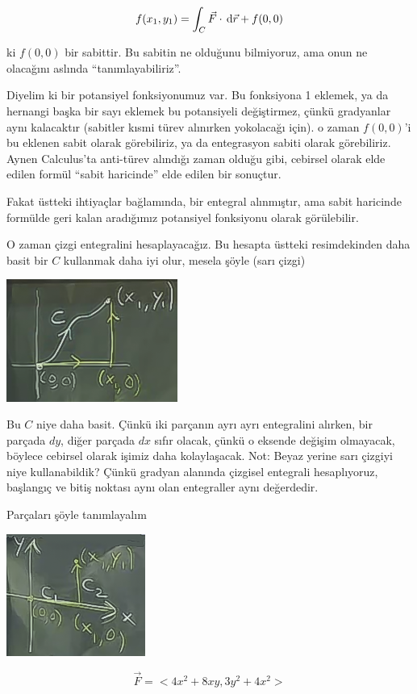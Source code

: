 \documentclass[12pt,fleqn]{article}\usepackage{../../common}
\begin{document}
$$ f(x_1,y_1) = \int_C \vec{F} \cdot \,\mathrm{d}\vec{r} + f(0,0) $$

ki $f(0,0)$ bir sabittir. Bu sabitin ne olduğunu bilmiyoruz, ama onun ne
olacağını aslında ``tanımlayabiliriz''. 

Diyelim ki bir potansiyel fonksiyonumuz var. Bu fonksiyona 1 eklemek, ya da
hernangi başka bir sayı eklemek bu potansiyeli değiştirmez, çünkü gradyanlar
aynı kalacaktır (sabitler kısmi türev alınırken yokolacağı için). o zaman
$f(0,0)$'i bu eklenen sabit olarak görebiliriz, ya da entegrasyon sabiti olarak
görebiliriz. Aynen Calculus'ta anti-türev alındığı zaman olduğu gibi, cebirsel
olarak elde edilen formül ``sabit haricinde'' elde edilen bir sonuçtur.

Fakat üstteki ihtiyaçlar bağlamında, bir entegral alınmıştır, ama sabit
haricinde formülde geri kalan aradığımız potansiyel fonksiyonu olarak
görülebilir.

O zaman çizgi entegralini hesaplayacağız. Bu hesapta üstteki resimdekinden daha
basit bir $C$ kullanmak daha iyi olur, mesela şöyle (sarı çizgi)
\begin{center}
\includegraphics[height=4cm]{21_3.png}
\end{center}
Bu $C$ niye daha basit. Çünkü iki parçanın ayrı ayrı entegralini alırken, bir
parçada $dy$, diğer parçada $dx$ sıfır olacak, çünkü o eksende değişim
olmayacak, böylece cebirsel olarak işimiz daha kolaylaşacak. Not: Beyaz yerine
sarı çizgiyi niye kullanabildik? Çünkü gradyan alanında çizgisel entegrali
hesaplıyoruz, başlangıç ve bitiş noktası aynı olan entegraller aynı değerdedir.

Parçaları şöyle tanımlayalım
\begin{center}
\includegraphics[height=4cm]{21_4.png}
\end{center}
$$ \vec{F} = <4x^2 + 8xy, 3y^2 + 4x^2>$$
\end{document}
